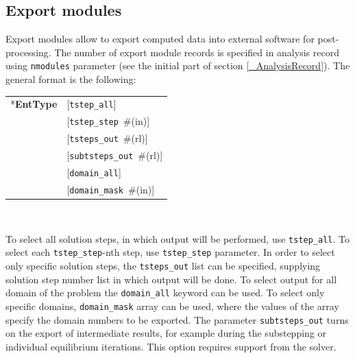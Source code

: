 \documentclass[a4paper]{article}
\makeatletter
\newcommand{\param}[1]{\texttt{#1}} %
\newcommand{\optional}[1]{[#1]} %
\newcommand{\field}[2]{\param{#1}~\#{\tiny(#2)}} %
\newcommand{\optField}[2]{\optional{\field{#1}{#2}}}
\newcommand{\fieldnotype}[1]{\param{#1}}
\newcommand{\entKeyword}[1]{*\textbf{#1}} %
\newenvironment{record}[1][]{\begin{tabular}{|ll}}{\end{tabular}\\}
\newcommand{\recentry}[2]{{#1}&{#2}\\}
\newcounter{rcc}
\newenvironment{record}[1][\textwidth]{\setcounter{rcc}{0}\begin{tabular*}{#1}{|ll@{\extracolsep{\fill}}r}}{\end{tabular*}\\}
\newcommand{\recentry}[2]{\ifthenelse{\value{rcc}>0}{&$\backslash$ \\}{\setcounter{rcc}{1}}{#1}&{#2}}
\makeatother
\begin{document}
\subsection{Export modules}
\label{ExportModulesSec}
Export modules allow to export computed data into external software for
post-processing. The number of export module records is specified in
analysis record using \param{nmodules} parameter (see the initial part of section \ref{_AnalysisRecord}). The general format
is the following:\\
\begin{record}
  \recentry{\entKeyword{EntType}}{[\fieldnotype{tstep\_all}]}
  \recentry{}{\optField{tstep\_step}{in}}
  \recentry{}{\optField{tsteps\_out}{rl}}
  \recentry{}{\optField{subtsteps\_out}{rl}}
  \recentry{}{[\fieldnotype{domain\_all}]}
  \recentry{}{\optField{domain\_mask}{in}}
\end{record}

To select all solution steps, in which output will be performed, use
\param{tstep\_all}. To select each \param{tstep\_step}-nth step, use
\param{tstep\_step} parameter. In order to select only specific
solution steps, the \param{tsteps\_out} list can be specified,
supplying solution step number list in which output will be done.
To select output for all domain of the problem the \param{domain\_all}
keyword can be used. To select only specific domains,
\param{domain\_mask} array can be used, where the values of the array
specify the domain numbers to be exported.
The parameter \param{subtsteps\_out} turns on the export of intermediate results, 
for example during the substepping or individual equilibrium iterations. This option requires support from the solver.
\end{document}
